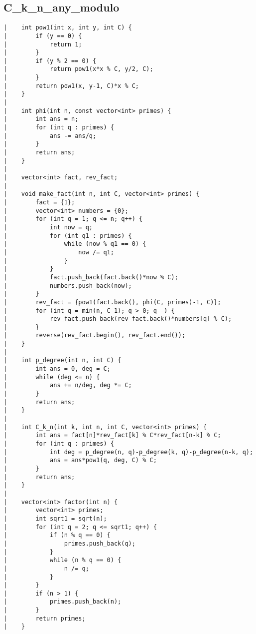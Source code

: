 \documentclass[a4paper, 10pt]{article}
\begin{document}
\begin{center}
\section*{C\_k\_n\_any\_modulo}
\begin{verbatim}
|    int pow1(int x, int y, int C) {
|        if (y == 0) {
|            return 1;
|        }
|        if (y % 2 == 0) {
|            return pow1(x*x % C, y/2, C);
|        }
|        return pow1(x, y-1, C)*x % C;
|    }
|    
|    int phi(int n, const vector<int> primes) {
|        int ans = n;
|        for (int q : primes) {
|            ans -= ans/q;
|        }
|        return ans;
|    }
|    
|    vector<int> fact, rev_fact;
|    
|    void make_fact(int n, int C, vector<int> primes) {
|        fact = {1};
|        vector<int> numbers = {0};
|        for (int q = 1; q <= n; q++) {
|            int now = q;
|            for (int q1 : primes) {
|                while (now % q1 == 0) {
|                    now /= q1;
|                }
|            }
|            fact.push_back(fact.back()*now % C);
|            numbers.push_back(now);
|        }
|        rev_fact = {pow1(fact.back(), phi(C, primes)-1, C)};
|        for (int q = min(n, C-1); q > 0; q--) {
|            rev_fact.push_back(rev_fact.back()*numbers[q] % C);
|        }
|        reverse(rev_fact.begin(), rev_fact.end());
|    }
|    
|    int p_degree(int n, int C) {
|        int ans = 0, deg = C;
|        while (deg <= n) {
|            ans += n/deg, deg *= C;
|        }
|        return ans;
|    }
|    
|    int C_k_n(int k, int n, int C, vector<int> primes) {
|        int ans = fact[n]*rev_fact[k] % C*rev_fact[n-k] % C;
|        for (int q : primes) {
|            int deg = p_degree(n, q)-p_degree(k, q)-p_degree(n-k, q);
|            ans = ans*pow1(q, deg, C) % C;
|        }
|        return ans;
|    }
|    
|    vector<int> factor(int n) {
|        vector<int> primes;
|        int sqrt1 = sqrt(n);
|        for (int q = 2; q <= sqrt1; q++) {
|            if (n % q == 0) {
|                primes.push_back(q);
|            }
|            while (n % q == 0) {
|                n /= q;
|            }
|        }
|        if (n > 1) {
|            primes.push_back(n);
|        }
|        return primes;
|    }
\end{verbatim}


\end{center}
\end{document}
